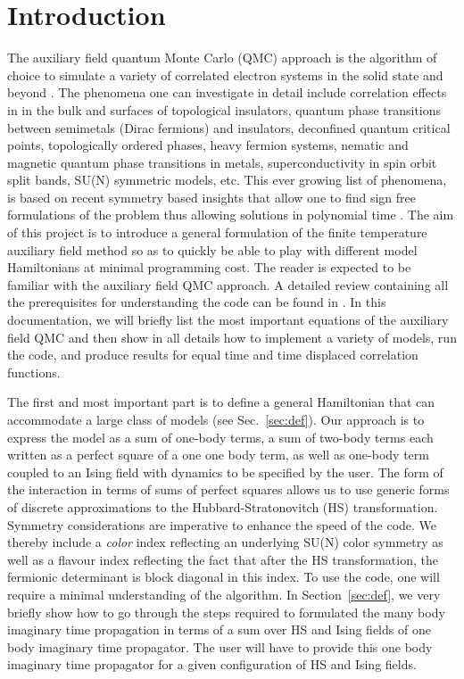 \section{Introduction}\label{sec:intro}


The auxiliary field quantum Monte Carlo (QMC) approach is the algorithm of choice to simulate a variety of correlated electron systems in the solid state and beyond \cite{Blankenbecler81,Assaad08_rev}.  The phenomena  one can investigate in detail include correlation effects in in the bulk and surfaces of topological insulators, quantum phase transitions between semimetals (Dirac fermions)  and insulators,  deconfined quantum critical points, topologically ordered phases, heavy fermion systems, nematic and magnetic quantum phase transitions in metals,   superconductivity in spin orbit split bands, SU(N) symmetric models,  etc.  This ever growing list of phenomena,  is based on  recent symmetry based insights that allow one to  find  sign free formulations of the  problem thus allowing solutions in polynomial time \cite{Wu04,Wei16}.   The aim of this project is to introduce a general formulation of the finite temperature  auxiliary field method  so as to quickly be able to play with different model Hamiltonians  at  minimal programming cost.      The reader is expected to be familiar with the auxiliary field QMC  approach. A detailed review containing all  the prerequisites for understanding  the code can be found in \cite{Assaad08_rev}.    In this documentation, we will briefly list the most important equations of the auxiliary field QMC and then show in all details how to implement a variety of models, run the code, and produce  results for  equal time and time displaced correlation functions. 

The first and most important  part is to define a general Hamiltonian  that  can  accommodate a large class of models  (see Sec.~\ref{sec:def}). Our approach is to express the model as a sum of one-body terms, a sum of two-body terms each written as a perfect square of a one one body term, as well as one-body  term  coupled to an Ising field with  dynamics to be specified by the user.   
The form of the interaction in terms of sums of perfect squares allows us to use generic forms of  discrete  approximations to the  Hubbard-Stratonovitch (HS)  transformation. 	 Symmetry considerations  are  imperative to enhance the speed of the code.   We thereby include a {\it color} index  reflecting  an underlying  SU(N) color symmetry as  well as a flavour index  reflecting  the fact that  after  the HS  transformation,  the  fermionic determinant is block diagonal in this index.    To use the code, one will require a minimal understanding of the algorithm.  In Section~\ref{sec:def}, we very briefly show how to go through  the steps required  to formulated the many body imaginary time propagation in terms of a sum  over HS and Ising fields  of one body  imaginary time propagator.   The user will have to provide this one body imaginary time propagator for a given configuration of   HS and  Ising fields.   
	  
